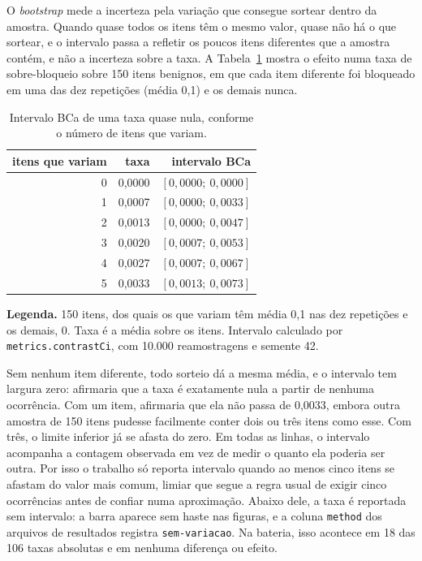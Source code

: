 O \textit{bootstrap} mede a incerteza pela variação que consegue sortear
dentro da amostra. Quando quase todos os itens têm o mesmo valor, quase não
há o que sortear, e o intervalo passa a refletir os poucos itens diferentes
que a amostra contém, e não a incerteza sobre a taxa. A
Tabela~\ref{tab:apeB_degenera} mostra o efeito numa taxa de sobre-bloqueio
sobre 150 itens benignos, em que cada item diferente foi bloqueado em uma das
dez repetições (média 0,1) e os demais nunca.

\begin{table}[H]
\centering
\caption{Intervalo BCa de uma taxa quase nula, conforme o número de itens que variam.}
\label{tab:apeB_degenera}
\begin{tabular}{rrr}
\toprule
itens que variam & taxa & intervalo BCa \\
\midrule
0 & 0,0000 & $[0{,}0000;\ 0{,}0000]$ \\
1 & 0,0007 & $[0{,}0000;\ 0{,}0033]$ \\
2 & 0,0013 & $[0{,}0000;\ 0{,}0047]$ \\
3 & 0,0020 & $[0{,}0007;\ 0{,}0053]$ \\
4 & 0,0027 & $[0{,}0007;\ 0{,}0067]$ \\
5 & 0,0033 & $[0{,}0013;\ 0{,}0073]$ \\
\bottomrule
\end{tabular}
\vspace{2pt}
\begin{minipage}{\textwidth}
\footnotesize\raggedright
\textbf{Legenda.} 150 itens, dos quais os que variam têm média 0,1 nas dez
repetições e os demais, 0. Taxa é a média sobre os itens. Intervalo calculado
por \texttt{metrics.contrastCi}, com 10.000 reamostragens e semente 42.
\end{minipage}
\end{table}

Sem nenhum item diferente, todo sorteio dá a mesma média, e o intervalo tem
largura zero: afirmaria que a taxa é exatamente nula a partir de nenhuma
ocorrência. Com um item, afirmaria que ela não passa de 0,0033, embora outra
amostra de 150 itens pudesse facilmente conter dois ou três itens como esse.
Com três, o limite inferior já se afasta do zero. Em todas as linhas, o
intervalo acompanha a contagem observada em vez de medir o quanto ela
poderia ser outra. Por isso o trabalho só reporta intervalo quando ao menos
cinco itens se afastam do valor mais comum, limiar que segue a regra usual de
exigir cinco ocorrências antes de confiar numa aproximação. Abaixo dele, a
taxa é reportada sem intervalo: a barra aparece sem haste nas figuras, e a
coluna \texttt{method} dos arquivos de resultados registra
\texttt{sem-variacao}. Na bateria, isso acontece em 18 das 106 taxas
absolutas e em nenhuma diferença ou efeito.

